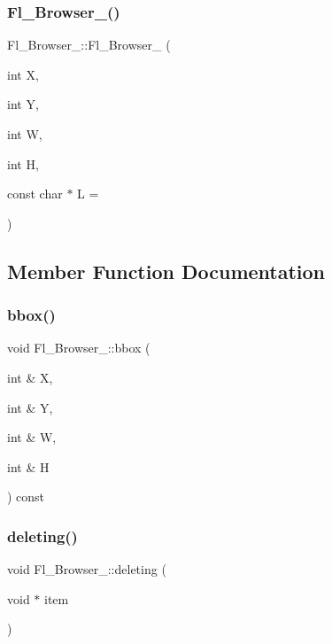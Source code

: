 \subsubsection{\texorpdfstring{Fl\+\_\+\+Browser\+\_\+()}{Fl\_Browser\_()}}
{\footnotesize\ttfamily Fl\+\_\+\+Browser\+\_\+\+::\+Fl\+\_\+\+Browser\+\_\+ (\begin{DoxyParamCaption}\item[{int}]{X,  }\item[{int}]{Y,  }\item[{int}]{W,  }\item[{int}]{H,  }\item[{const char $\ast$}]{L = {} }\end{DoxyParamCaption})\hspace{0.3cm}{\ttfamily [protected]}}



\subsection{Member Function Documentation}
\mbox{\label{class_fl___browser___a280d61654c588bc6a5602e4a65e321ca}} 
\subsubsection{\texorpdfstring{bbox()}{bbox()}}
{\footnotesize\ttfamily void Fl\+\_\+\+Browser\+\_\+\+::bbox (\begin{DoxyParamCaption}\item[{int \&}]{X,  }\item[{int \&}]{Y,  }\item[{int \&}]{W,  }\item[{int \&}]{H }\end{DoxyParamCaption}) const\hspace{0.3cm}{\ttfamily [protected]}}

\mbox{\label{class_fl___browser___a0e14ea8be60dc03d76124ed5d3a1b58d}} 
\subsubsection{\texorpdfstring{deleting()}{deleting()}}
{\footnotesize\ttfamily void Fl\+\_\+\+Browser\+\_\+\+::deleting (\begin{DoxyParamCaption}\item[{void $\ast$}]{item }\end{DoxyParamCaption})\hspace{0.3cm}{\ttfamily [protected]}}

